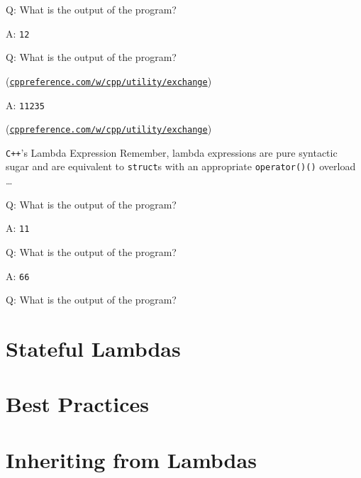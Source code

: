 \begin{frame}[fragile]{Q: What is the output of the program?}
\end{frame}

\begin{frame}[fragile]{A: \texttt{12}}
\end{frame}

\begin{frame}[fragile]{Q: What is the output of the program?}

    \begin{center}
        (\href{https://en.cppreference.com/w/cpp/utility/exchange}{\texttt{cppreference.com/w/cpp/utility/exchange}})
    \end{center}
\end{frame}

\begin{frame}[fragile]{A: \texttt{11235}}

    \begin{center}
        (\href{https://en.cppreference.com/w/cpp/utility/exchange}{\texttt{cppreference.com/w/cpp/utility/exchange}})
    \end{center}
\end{frame}

\begin{frame}{\texttt{C++}'s Lambda Expression}
    Remember, lambda expressions are pure syntactic sugar and are equivalent to \texttt{struct}s with an appropriate \texttt{operator()()} overload \ldots
\end{frame}

\begin{frame}[fragile]{Q: What is the output of the program?}
\end{frame}

\begin{frame}[fragile]{A: \texttt{11}}
\end{frame}

\begin{frame}[fragile]{Q: What is the output of the program?}
\end{frame}

\begin{frame}[fragile]{A: \texttt{66}}
\end{frame}

\begin{frame}[fragile]{Q: What is the output of the program?}

\end{frame}


\section{Stateful Lambdas}

\section{Best Practices}

\section{Inheriting from Lambdas}
